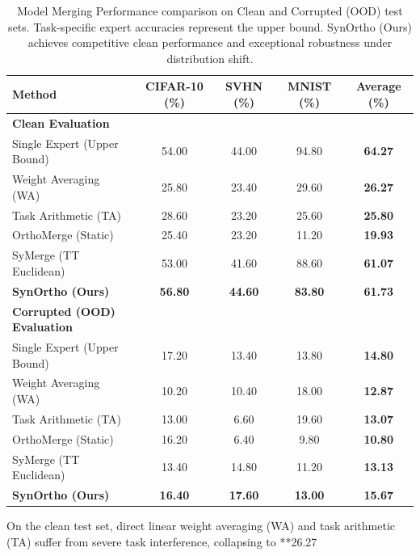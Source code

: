 \documentclass{article}
\theoremstyle{plain}
\theoremstyle{definition}
\theoremstyle{remark}
\begin{document}
\begin{table}[t]
\caption{Model Merging Performance comparison on Clean and Corrupted (OOD) test sets. Task-specific expert accuracies represent the upper bound. SynOrtho (Ours) achieves competitive clean performance and exceptional robustness under distribution shift.}
\label{tab:results_table}
\vskip 0.15in
\begin{center}
\begin{small}
\begin{sc}
\begin{tabular}{lcccc}
\toprule
Method & CIFAR-10 (\%) & SVHN (\%) & MNIST (\%) & \textbf{Average (\%)} \\
\midrule
\textbf{Clean Evaluation} & & & & \\
Single Expert (Upper Bound) & 54.00 & 44.00 & 94.80 & \textbf{64.27} \\
Weight Averaging (WA) & 25.80 & 23.40 & 29.60 & \textbf{26.27} \\
Task Arithmetic (TA) & 28.60 & 23.20 & 25.60 & \textbf{25.80} \\
OrthoMerge (Static) & 25.40 & 23.20 & 11.20 & \textbf{19.93} \\
SyMerge (TT Euclidean) & 53.00 & 41.60 & 88.60 & \textbf{61.07} \\
\textbf{SynOrtho (Ours)} & \textbf{56.80} & \textbf{44.60} & \textbf{83.80} & \textbf{61.73} \\
\midrule
\textbf{Corrupted (OOD) Evaluation} & & & & \\
Single Expert (Upper Bound) & 17.20 & 13.40 & 13.80 & \textbf{14.80} \\
Weight Averaging (WA) & 10.20 & 10.40 & 18.00 & \textbf{12.87} \\
Task Arithmetic (TA) & 13.00 & 6.60 & 19.60 & \textbf{13.07} \\
OrthoMerge (Static) & 16.20 & 6.40 & 9.80 & \textbf{10.80} \\
SyMerge (TT Euclidean) & 13.40 & 14.80 & 11.20 & \textbf{13.13} \\
\textbf{SynOrtho (Ours)} & \textbf{16.40} & \textbf{17.60} & \textbf{13.00} & \textbf{15.67} \\
\bottomrule
\end{tabular}
\end{sc}
\end{small}
\end{center}
\vskip -0.1in
\end{table}

On the clean test set, direct linear weight averaging (WA) and task arithmetic (TA) suffer from severe task interference, collapsing to **26.27%
\end{document}
